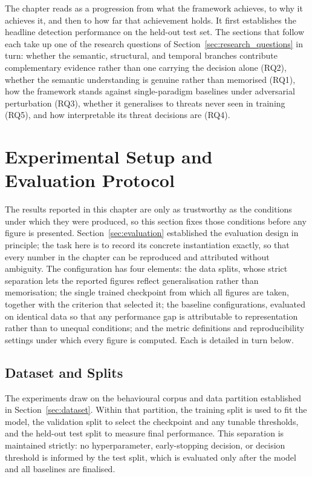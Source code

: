 \documentclass[%
    BCOR=10mm,
    DIV=13,
    toc=bibliography,
    toc=listof,
    oneside,
    12pt,
]{scrbook}
\begin{document}
The chapter reads as a progression from what the framework achieves, to why it
achieves it, and then to how far that achievement holds. It first establishes
the headline detection performance on the held-out test set. The sections that
follow each take up one of the research questions of
Section~\ref{sec:research_questions} in turn: whether the semantic, structural,
and temporal branches contribute complementary evidence rather than one carrying
the decision alone (RQ2), whether the semantic understanding is genuine rather
than memorised (RQ1), how the framework stands against single-paradigm baselines
under adversarial perturbation (RQ3), whether it generalises to threats never
seen in training (RQ5), and how interpretable its threat decisions are (RQ4).


\section{Experimental Setup and Evaluation Protocol}
\label{sec:exp_setup}

The results reported in this chapter are only as trustworthy as the conditions
under which they were produced, so this section fixes those conditions before
any figure is presented. Section~\ref{sec:evaluation} established the
evaluation design in principle; the task here is to record its concrete
instantiation exactly, so that every number in the chapter can be reproduced
and attributed without ambiguity. The configuration has four elements: the
data splits, whose strict separation lets the reported figures reflect
generalisation rather than memorisation; the single trained checkpoint from
which all figures are taken, together with the criterion that selected it; the
baseline configurations, evaluated on identical data so that any performance
gap is attributable to representation rather than to unequal conditions; and
the metric definitions and reproducibility settings under which every figure
is computed. Each is detailed in turn below.

\subsection{Dataset and Splits}
\label{subsec:exp_dataset}

The experiments draw on the behavioural corpus and data partition established in
Section~\ref{sec:dataset}. Within that partition, the training split is used to
fit the model, the validation split to select the checkpoint and any tunable
thresholds, and the held-out test split to measure final performance. This
separation is maintained strictly: no hyperparameter,
early-stopping decision, or decision threshold is informed by the test split,
which is evaluated only after the model and all baselines are finalised.
\end{document}

